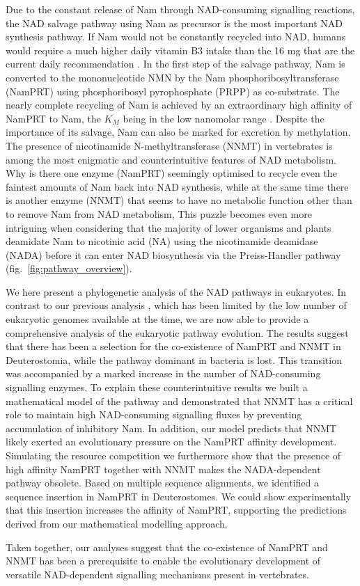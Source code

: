 Due to the constant release of Nam through NAD-consuming signalling reactions, the NAD salvage pathway using Nam as precursor is the most important NAD synthesis pathway. If Nam would not be constantly recycled into NAD, humans would require a much higher daily vitamin B3 intake than the 16 mg that are the current daily recommendation \cite{CommissionofEuropeanCommunities2008}. In the first step of the salvage pathway, Nam is converted to the mononucleotide NMN by the Nam phosphoribosyltransferase (NamPRT) using phosphoribosyl pyrophosphate (PRPP) as co-substrate. The nearly complete recycling of Nam is achieved by an extraordinary high affinity of NamPRT to Nam, the $K_{M}$ being in the low nanomolar range \cite{Burgos2008}. Despite the importance of its salvage, Nam can also be marked for excretion by methylation. The presence of nicotinamide N-methyltransferase (NNMT) in vertebrates \cite{Gossmann2012FEBS} is among the most enigmatic and counterintuitive features of NAD metabolism. Why is there one enzyme (NamPRT) seemingly optimised to recycle even the faintest amounts of Nam back into NAD synthesis, while at the same time there is another enzyme (NNMT) that seems to have no metabolic function other than to remove Nam from NAD metabolism, This puzzle becomes even more intriguing when considering that the majority of lower organisms and plants deamidate Nam to nicotinic acid (NA) using the nicotinamide deamidase (NADA) before it can enter NAD biosynthesis via the Preiss-Handler pathway (fig.~\ref{fig:pathway_overview}).

We here present a phylogenetic analysis of the NAD pathways in eukaryotes. In contrast to our previous analysis \cite{Gossmann2012FEBS}, which has been limited by the low number of eukaryotic genomes available at the time, we are now able to provide a comprehensive analysis of the eukaryotic pathway evolution. The results suggest that there has been a selection for the co-existence of NamPRT and NNMT in Deuterostomia, while the pathway dominant in bacteria is lost. This transition was accompanied by a marked increase in the number of NAD-consuming signalling enzymes. To explain these counterintuitive results we built a mathematical model of the pathway and demonstrated that NNMT has a critical role to maintain high NAD-consuming signalling fluxes by preventing accumulation of inhibitory Nam. In addition, our model predicts that NNMT likely exerted an evolutionary pressure on the NamPRT affinity development. Simulating the resource competition we furthermore show that the presence of high affinity NamPRT together with NNMT makes the NADA-dependent pathway obsolete. Based on multiple sequence alignments, we identified a sequence insertion in NamPRT in Deuterostomes. We could show experimentally that this insertion increases the affinity of NamPRT, supporting the predictions derived from our mathematical modelling approach.

Taken together, our analyses suggest that the co-existence of NamPRT and NNMT has been a prerequisite to enable the evolutionary development of versatile NAD-dependent signalling mechanisms present in vertebrates.
